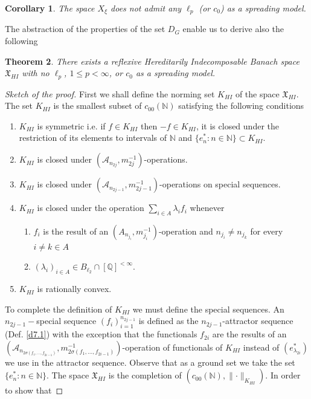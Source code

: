 \documentclass[a4paper]{amsart}
\theoremstyle{plain}
\newtheorem{theorem}{Theorem}[section]
\newtheorem{corollary}[theorem]{Corollary}
\newcommand{\N}{\mathbb{N}}
\newcommand{\Q}{\mathbb{Q}}
\newcommand{\mc}{\mathcal}
\newcommand{\norm}[1][\cdot]{\lVert #1\rVert}
\begin{document}
\begin{corollary}\label{c4.15} The space  $X_{\xi}$ does not admit  any $\ell_p$ (or $c_0$) as a spreading model.
\end{corollary}
The abstraction of the properties of the set $D_{G}$ enable us to derive also the following
\begin{theorem} There exists a reflexive Hereditarily Indecomposable Banach space $\mathfrak{X}_{HI}$ with no $\ell_{p}$, $1\leq p<\infty$, or $c_{0}$ as a spreading model.
\end{theorem}
\begin{proof}[Sketch of the proof]
First we shall define the norming set $K_{HI}$ of the space $\mathfrak{X}_{HI}$.  The set $K_{HI}$ is the smallest subset of $c_{00}(\N)$ satisfying the following conditions
\begin{enumerate}
\item  $K_{HI}$ is symmetric i.e. if $f\in K_{HI}$ then $-f\in K_{HI}$, it is closed under the restriction of its elements to intervals of $\N$ and $\{e_n^{*}: n\in\N\}\subset K_{HI}$.
\item $K_{HI}$ is closed under $(\mc{A}_{n_{2j}},m_{2j}^{-1})$-operations.
\item $K_{HI}$ is closed under $(\mc{A}_{n_{2j-1}},m_{2j-1}^{-1})$-operations on special sequences.
\item $K_{HI}$ is closed under the  operation $\sum_{i\in A}\lambda_{i}f_{i}$ whenever
\begin{enumerate}
\item  $f_{i}$ is the  result of an $(A_{n_{j_i}},
m_{j_i}^{-1})$-operation and $n_{j_i}\ne n_{j_{k}}$ for every
$i\ne k\in A$ \item $(\lambda_{i})_{i\in A}\in B_{\ell_2}\cap
[\Q]^{<\infty}$.
\end{enumerate}
\item $K_{HI}$ is rationally convex.
\end{enumerate}
To complete the definition of $K_{HI}$ we must define the special sequences. An
$n_{2j-1}-$special sequence $(f_{i})_{i=1}^{n_{2j-1}}$ is defined  as the
$n_{2j-1}$-attractor sequence  (Def. \ref{d7.1})  with the exception  that the functionals
$f_{2i}$  are  the results of an $(\mc{A}_{n_{2\sigma(f_{1},\dots,f_{2i-1})}},
m_{2\sigma(f_{1},\dots,f_{2i-1})}^{-1})$-operation of functionals of $K_{HI}$  instead of
$(e^{*}_{\lambda_{2i}})$ we use in the attractor sequence. Observe that as a ground set  we take the set $\{e_n^{*}:n\in\N\}$. The space $\mathfrak{X}_{HI}$
is the completion  of $(c_{00}(\N), \norm_{K_{HI}})$. In order to show that

\end{proof}
\end{document}
